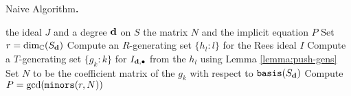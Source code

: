 \documentclass[fleqn,reqno]{amsart}
\numberwithin{first}{chapter}
\begin{document}
\begin{algorithm} {\sc Naive Algorithm\bf.}
\label{algo:naive}
\begin{algorithmic}
   the ideal $J$ and a degree $\mathbf d$ on $S$
   the matrix $N$ and the implicit equation $P$
  \State Set $r=\dim_{\mathbb{C}}(S_{\mathbf d})$
  \State Compute an $R$-generating set $\{h_l:l\}$ for the Rees ideal $I$
  \State Compute a $T$-generating set $\{g_k:k\}$ for $I_{\mathbf d,\bullet}$ from the $h_l$
  	using Lemma \ref{lemma:push-gens}
  \State Set $N$ to be the coefficient matrix of the $g_k$ with respect to $\mathop{\tt basis}(S_\mathbf d)$
  \State Compute $P=\gcd(\mathop{\tt minors}(r,N))$
\end{algorithmic}
\end{algorithm}
\end{document}
